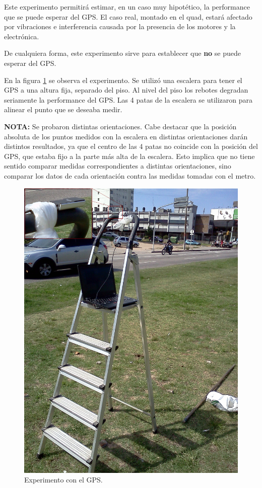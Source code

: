 \documentclass[spanish,12pt,a4paper,titlepage]{report}
\begin{document}
Este experimento permitirá estimar, en un caso muy hipotético, la performance que se puede esperar del GPS. El caso real, montado en el quad, estará afectado por vibraciones e interferencia causada por la presencia de los motores y la electrónica.

De cualquiera forma, este experimento sirve para establecer que \textbf{no} se puede esperar del GPS.

En la figura \ref{fig:gps_setup.png} se observa el experimento. Se utilizó una escalera para tener el GPS a una altura fija, separado del piso. Al nivel del piso los rebotes degradan seriamente la performance del GPS. Las 4 patas de la escalera se utilizaron para alinear el punto que se deseaba medir.

\textbf{NOTA:} Se probaron distintas orientaciones. Cabe destacar que la posición absoluta de los puntos medidos con la escalera en distintas orientaciones darán distintos resultados, ya que el centro de las 4 patas no coincide con la posición del GPS, que estaba fijo a la parte más alta de la escalera. Esto implica que no tiene sentido comparar medidas correspondientes a distintas orientaciones, sino comparar los datos de cada orientación contra las medidas tomadas con el metro.

\begin{figure}[h!]
  \begin{center}
  \includegraphics[width=.7\textwidth]{./img/gps_setup.png}
  \end{center}
  \caption{Experimento con el GPS.}
  \label{fig:gps_setup.png}
\end{figure}
\end{document}
